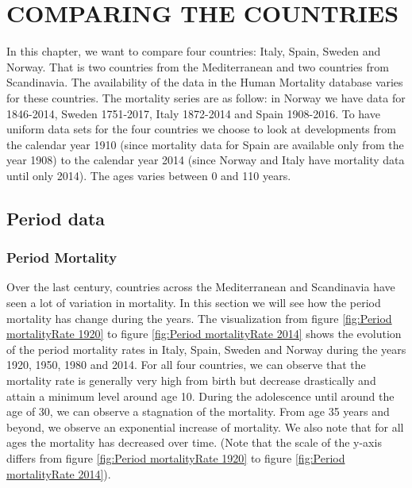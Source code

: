 \chapter{COMPARING THE COUNTRIES}
\label{sec:fourth}


In this chapter, we want to compare four countries: Italy, Spain, Sweden and Norway. 
That is two countries from the Mediterranean and two countries from Scandinavia.
The availability of the data in the Human Mortality database varies for these countries.
The mortality series are as follow: in Norway we have data for 1846-2014, Sweden 1751-2017, Italy 1872-2014 and Spain 1908-2016.
To have uniform data sets for the four countries we choose to look at developments from the calendar year 1910 (since mortality data for Spain are available only from the year 1908) to the calendar year 2014 (since Norway and Italy have mortality data until only 2014).
The ages varies between 0 and 110 years.

\section{Period data}

\subsection{Period Mortality}

Over the last century, countries across the Mediterranean and Scandinavia have seen a lot of variation in mortality.
In this section we will see how the period mortality has change during the years.
The visualization from figure \ref{fig:Period mortalityRate 1920} to figure \ref{fig:Period mortalityRate 2014}  shows the evolution of the period mortality rates in Italy, Spain, Sweden and Norway during the years 1920, 1950, 1980 and 2014. 
For all four countries, we can observe that the  mortality rate is generally very high from  birth but decrease drastically and attain a minimum level around age 10. 
During the adolescence  until around the age of 30, we can observe a stagnation of the mortality. 
From age 35 years and beyond, we observe an exponential increase of mortality.
We also note that for all ages the mortality has decreased over time.
(Note that the scale of the y-axis differs from figure \ref{fig:Period mortalityRate 1920} to figure \ref{fig:Period mortalityRate 2014}).




